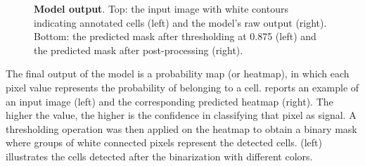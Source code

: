 \begin{figure}
    \caption{\textbf{Model output}. 
    Top: the input image with white contours indicating annotated cells  (left) and the model's raw output  (right).
    Bottom: the predicted mask after thresholding at 0.875 (left) and the predicted mask after post-processing (right).}
    \label{fig:model_output}
\end{figure}
The final output of the model is a probability map (or heatmap), in which each pixel value represents the probability of belonging to a cell. 
 reports an example of an input image (left) and the corresponding predicted heatmap (right).
The higher the value, the higher is the confidence in classifying that pixel as signal. 
A thresholding operation was then applied on the heatmap to obtain a binary mask where groups of white connected pixels represent the detected cells.  (left) illustrates the cells detected after the binarization with different colors.
